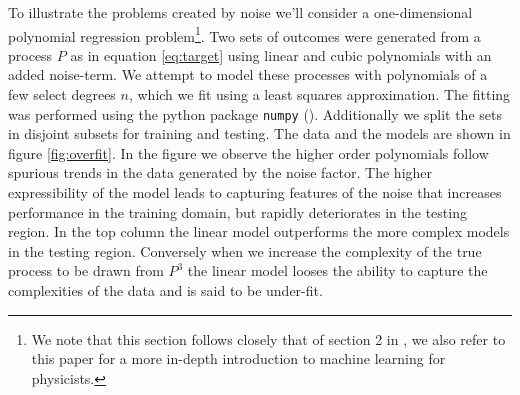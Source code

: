 To illustrate the problems created by noise we'll consider a one-dimensional polynomial regression problem\footnote{We note that this section follows closely that of section 2 in \citet{Mehta2019}, we also refer to this paper for a more in-depth introduction to machine learning for physicists.}. Two sets of outcomes were generated from a process $P$ as in equation \ref{eq:target} using linear and cubic polynomials with an added noise-term. We attempt to model these processes with polynomials of a few select degrees $n$, which we fit using a least squares approximation. The fitting was performed using the python package \lstinline{numpy} (\cite{numpy}). Additionally we split the sets in disjoint subsets for training and testing. The data and the models are shown in figure \ref{fig:overfit}. In the figure we observe the higher order polynomials follow spurious trends in the data generated by the noise factor. The higher expressibility of the model leads to capturing features of the noise that increases performance in the training domain, but rapidly deteriorates in the testing region. In the top column the linear model outperforms the more complex models in the testing region. Conversely when we increase the complexity of the true process to be drawn from $P^3$ the linear model looses the ability to capture the complexities of the data and is said to be under-fit.  

